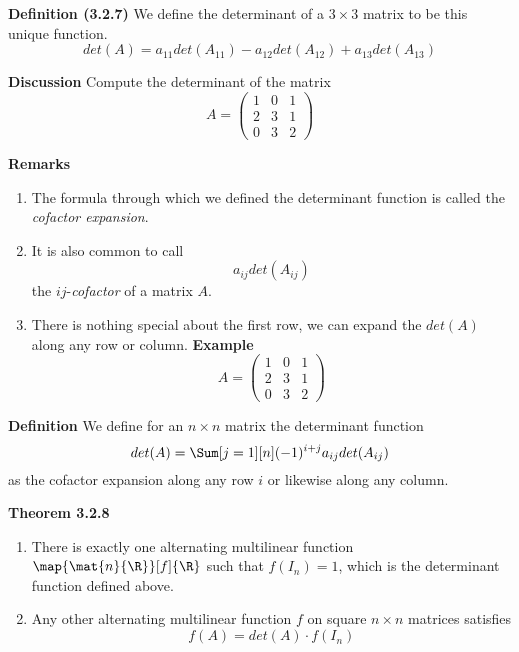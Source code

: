 \documentclass[letterpaper, 10pt]{article}
\begin{document}
\lb
\textbf{Definition (3.2.7)}
\lb
We define the determinant of a $3 \times 3$ matrix to be this unique function.
\[ det(A) = a_{11} det(A_{11}) - a_{12} det(A_{12}) + a_{13} det(A_{13}) \]





\vspace{200pt}
\lb
\textbf{Discussion}
\lb
Compute the determinant of the matrix
\[ A = \begin{pmatrix} 1 & 0 & 1 \\ 2 & 3 & 1 \\ 0 & 3 & 2 \end{pmatrix} \]






\newpage
\textbf{Remarks}
\lb
\begin{enumerate}
    \item The formula through which we defined the determinant function
        is called the \emph{cofactor expansion}.
    \item It is also common to call
        \[ a_{ij} det(A_{ij}) \]
        the $ij$-\emph{cofactor} of a matrix $A$.
    \item
        There is nothing special about the first row, we can expand the $det(A)$ along
        any row or column.
        \lb
        \textbf{Example}
        \lb
        \[ A = \begin{pmatrix} 1 & 0 & 1 \\ 2 & 3 & 1 \\ 0 & 3 & 2 \end{pmatrix} \]
\end{enumerate}


\vspace{150pt}
\lb
\textbf{Definition} We define for an $n \times n$ matrix the determinant function
\[ det(A) = \Sum[j=1][n] (-1)^{i + j} a_{ij} det(A_{ij})\]
as the cofactor expansion along any row $i$ or likewise along any column.

\lb
\textbf{Theorem 3.2.8}
\lb
\begin{enumerate}
    \item There is exactly one alternating multilinear function $\map{\mat{n}{\R}}[f]{\R}$
        such that $f(I_n) = 1$, which is the determinant function defined above.
    \item Any other alternating multilinear function $f$ on square $n \times n$ matrices
        satisfies
        \[ f(A) = det(A) \cdot f(I_n) \]
\end{enumerate}
\end{document}
